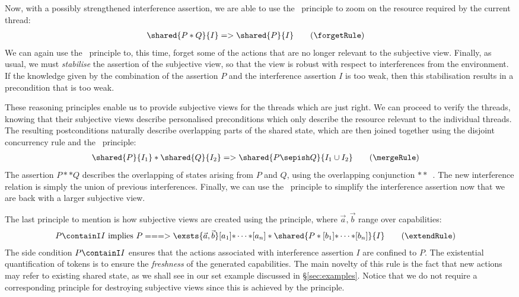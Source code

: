 Now, with a possibly strengthened interference assertion, we are able to use the \forgetRule\ principle to zoom  on the resource required by the current thread:
%
\begin{align*}\label{eq:forget}
  \shared{P * Q}{I} &=> \shared{P}{I}  \tag{\forgetRule}
\end{align*}
%
We can again use the \shiftRule\ principle to, this time, forget some of the actions that are no longer relevant to the subjective view. Finally, as usual, we must {\em stabilise} the assertion of the subjective view,  so that the view is robust with respect to interferences from the environment. If the knowledge given by the combination of the assertion $P$ and the interference assertion $I$ is too weak, then this stabilisation results in a precondition that is too weak. 

These reasoning principles enable us to provide subjective views for the threads which are just right. 
We can proceed to verify the threads, knowing that their subjective views describe personalised preconditions which only describe the resource relevant to the individual threads. The resulting postconditions naturally describe overlapping parts of the shared state, which are then joined together using the disjoint concurrency rule and the \mergeRule\ principle:
%
\begin{align*}\label{eq:merge}
  \shared{P}{I_1} * \shared{Q}{I_2} &=> \shared{P \sepish Q}{I_1 \cup I_2} \tag{\mergeRule}
\end{align*}
%
The assertion $P ** Q$ describes the overlapping of states arising from $P$ and $Q$, using the overlapping conjunction $**$~\cite{ramification,js-popl12}. 
The new interference relation is simply the union of previous interferences. Finally, we can use the \shiftRule\ principle to simplify the interference assertion now that we are back with a larger subjective view.

The last principle to mention is how subjective views are created using the \extendRule principle, where $\vec a, \vec b$ range over capabilities:
%
\begin{align}\label{eq:extend}
  P \containI I
  &\text{ implies }
  P ===>
  \exsts{\vec{{a}}, \vec{{b}}}[{a}_1] {*} \cdots {*}
        [ a_n] * \shared{P *
   [{b}_1] {*} \cdots {*} [{b}_n]}{I}
  \tag{\extendRule}
\end{align}
%
The side condition $P \containI I$ ensures that the actions associated with interference assertion $I$ are confined to $P$. The existential quantification of tokens is to ensure the \emph{freshness} of the generated capabilities. 
The main novelty of this rule is the fact that new actions may refer to existing shared state, as we shall see  in our set example discussed in \S\ref{sec:examples}. Notice that we  do not require a corresponding principle for destroying subjective views since this is achieved by the \forgetRule principle. 

